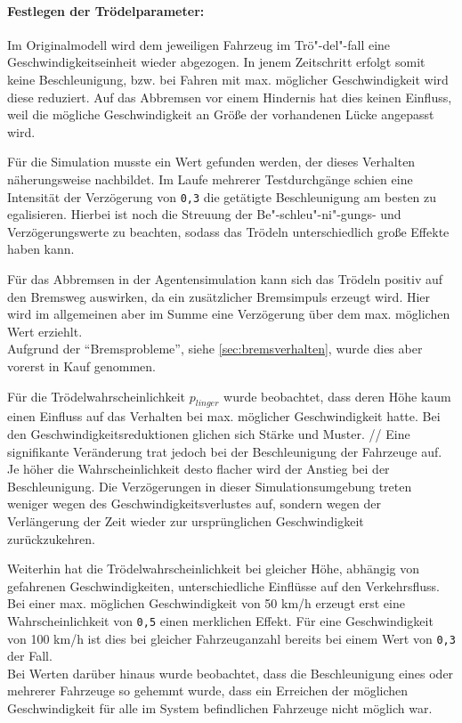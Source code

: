 \paragraph*{Festlegen der Trödelparameter:}
\label{sec:lingersweetspot}

Im Originalmodell wird dem jeweiligen Fahrzeug im Trö"-del"-fall eine Geschwindigkeitseinheit wieder abgezogen. 
In jenem Zeitschritt erfolgt somit keine Beschleunigung, bzw. bei Fahren mit max. möglicher Geschwindigkeit wird diese reduziert. 
Auf das Abbremsen vor einem Hindernis hat dies keinen Einfluss, weil die mögliche Geschwindigkeit an Größe der vorhandenen Lücke angepasst wird.

Für die Simulation musste ein Wert gefunden werden, der dieses Verhalten näherungsweise nachbildet.
Im Laufe mehrerer Testdurchgänge schien eine Intensität der Verzögerung von \texttt{0,3} die getätigte Beschleunigung am besten zu egalisieren. 
Hierbei ist noch die Streuung der Be"-schleu"-ni"-gungs- und Verzögerungswerte zu beachten, sodass das Trödeln unterschiedlich große Effekte haben kann.

Für das Abbremsen in der Agentensimulation kann sich das Trödeln positiv auf den Bremsweg auswirken, da ein zusätzlicher Bremsimpuls erzeugt wird. 
Hier wird im allgemeinen aber im Summe eine Verzögerung über dem max. möglichen Wert erziehlt.
\\
Aufgrund der \enquote{Bremsprobleme}, siehe \cref{sec:bremsverhalten}, wurde dies aber vorerst in Kauf genommen.

Für die Trödelwahrscheinlichkeit $ p_{linger} $ wurde beobachtet, dass deren Höhe kaum einen Einfluss auf das Verhalten bei max. möglicher Geschwindigkeit hatte.
Bei den Geschwindigkeitsreduktionen glichen sich Stärke und Muster.
//
Eine signifikante Veränderung trat jedoch bei der Beschleunigung der Fahrzeuge auf.
Je höher die Wahrscheinlichkeit desto flacher wird der Anstieg bei der Beschleunigung.
Die Verzögerungen in dieser Simulationsumgebung treten weniger wegen des Geschwindigkeitsverlustes auf, sondern wegen der Verlängerung der Zeit wieder zur ursprünglichen Geschwindigkeit zurückzukehren.

Weiterhin hat die Trödelwahrscheinlichkeit bei gleicher Höhe, abhängig von gefahrenen Geschwindigkeiten, unterschiedliche Einflüsse auf den Verkehrsfluss.
\\
Bei einer max. möglichen Geschwindigkeit von 50 km/h erzeugt erst eine Wahrscheinlichkeit von \texttt{0,5} einen merklichen Effekt. Für eine Geschwindigkeit von 100 km/h ist dies bei gleicher Fahrzeuganzahl bereits bei einem Wert von \texttt{0,3} der Fall.
\\
Bei Werten darüber hinaus wurde beobachtet, dass die Beschleunigung eines oder mehrerer Fahrzeuge so gehemmt wurde, dass ein Erreichen der möglichen Geschwindigkeit für alle im System befindlichen Fahrzeuge nicht möglich war.

